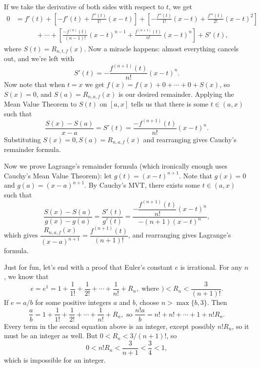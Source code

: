 \documentclass[letterpaper,12pt]{article}
\begin{document}
If we take the derivative of both sides with respect to $t$, we get
\begin{align*}
 0 &= f'(t)+\left[-f'(t)+\frac{f''(t)}{1!}(x-t)\right]+\left[-\frac{f''(t)}{1!}(x-t)+\frac{f'''(t)}{2!}(x-t)^2\right]\\
 &\quad\quad\quad +\cdots + \left[\frac{-f^{(n)}(t)}{(n-1)!}(x-t)^{n-1}+\frac{f^{(n+1)}(t)}{n!}(x-t)^n\right]+S'(t),
\end{align*}
where $S(t)=R_{n,t,f}(x)$. Now a miracle happens: almost everything cancels out, and we're left with
\[
 S'(t) = -\frac{f^{(n+1)}(t)}{n!}(x-t)^n.
\]
Now note that when $t=x$ we get $f(x)=f(x)+0+\cdots +0+S(x)$, so $S(x)=0$, and $S(a)=R_{n,a,f}(x)$ is our desired remainder. Applying the Mean Value Theorem to $S(t)$ on $[a,x]$ tells us that there is some $t\in (a,x)$ such that
\[
 \frac{S(x)-S(a)}{x-a}=S'(t)=\frac{-f^{(n+1)}(t)}{n!}(x-t)^n.
\]
Substituting $S(x)=0, S(a)=R_{n,a,f}(x)$ and rearranging gives Cauchy's remainder formula.

Now we prove Lagrange's remainder formula (which ironically enough uses Cauchy's Mean Value Theorem): let $g(t)=(x-t)^{n+1}$. Note that $g(x)=0$ and $g(a)=(x-a)^{n+1}$. By Cauchy's MVT, there exists some $t\in (a,x)$ such that
\[
 \frac{S(x)-S(a)}{g(x)-g(a)}=\frac{S'(t)}{g'(t)} = \frac{-\dfrac{f^{(n+1)}(t)}{n!}(x-t)^n}{-(n+1)(x-t)^n},
\]
which gives $\dfrac{R_{n,a,f}(x)}{(x-a)^{n+1}}=\dfrac{f^{(n+1)}(t)}{(n+1)!}$, and rearranging gives Lagrange's formula.

\bigskip

Just for fun, let's end with a proof that Euler's constant $e$ is irrational. For any $n$, we know that
\[
 e = e^1 = 1+\frac{1}{1!}+\frac{1}{2!}+\cdots+\frac{1}{n!}+R_n, \text{ where } )<R_n<\frac{3}{(n+1)!}.
\]
If $e=a/b$ for some positive integers $a$ and $b$, choose $n>\max\{b,3\}$. Then
\[
 \frac{a}{b} = 1+\frac{1}{1!}+\frac{1}{2!}+\cdots+\frac{1}{n!}+R_n, \text{ so } \frac{n!a}{b} = n! +n! +\cdots + 1+n!R_n.
\]
Every term in the second equation above is an integer, except possibly $n!R_n$, so it must be an integer as well. But $0<R_n<3/(n+1)!$, so 
\[
 0<n!R_n<\frac{3}{n+1}<\frac{3}{4}<1,
\]
which is impossible for an integer.
\end{document}
